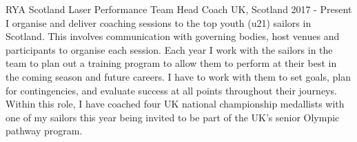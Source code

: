   \cventry
    {RYA Scotland} %
    {Laser Performance Team Head Coach} %
    {UK, Scotland} %
    {2017 - Present} %
    {
        I organise and deliver coaching sessions to the top youth (u21) sailors in Scotland. This involves communication with governing bodies, host venues and participants to organise each session. Each year I work with the sailors in the team to plan out a training program to allow them to perform at their best in the coming season and future careers. I have to work with them to set goals, plan for contingencies, and evaluate success at all points throughout their journeys.\newline
        Within this role, I have coached four UK national championship medallists with one of my sailors this year being invited to be part of the UK's senior Olympic pathway program.\newline
     }
